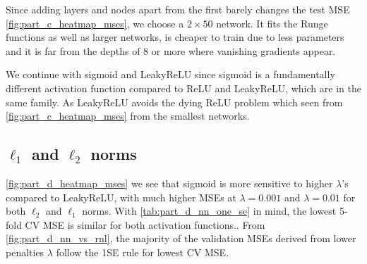 \documentclass[reprint,english,notitlepage, floatfix]{revtex4-2}  %
\begin{document}
Since adding layers and nodes apart from the first barely changes the test MSE \autoref{fig:part_c_heatmap_mses}, we choose a $2 \times 50$ network. It fits the Runge functions as well as larger networks, is cheaper to train due to less parameters and it is far from the depths of 8 or more where vanishing gradients appear.

We continue with sigmoid and LeakyReLU since sigmoid is a fundamentally different activation function compared to ReLU and LeakyReLU, which are in the same family. As LeakyReLU avoids the dying ReLU problem which seen from \autoref{fig:part_c_heatmap_mses} from the smallest networks.

\subsection{$\ell_1$ and $\ell_2$ norms}\label{sec:res_d} %


\autoref{fig:part_d_heatmap_mses} we see that sigmoid is more sensitive to higher $\lambda$'s compared to LeakyReLU, with much higher MSEs at $\lambda = 0.001$ and $\lambda=0.01$ for both $\ell_2$ and $\ell_1$ norms. With \autoref{tab:part_d_nn_one_se} in mind, the lowest 5-fold CV MSE is similar for both activation functions.. From \autoref{fig:part_d_nn_vs_rnl}, the majority of the validation MSEs derived from lower penalties $\lambda$ follow the 1SE rule for lowest CV MSE.


\begin{table}[htbp]
    \centering
\caption{The lowest cross-validated MSE is nearly the same for both activation functions in the 2 x 50 network for both penalties. Whereas the one standard error choices for sigmoid is higher than the one standard error choices for LeakyReLU}
    \label{tab:part_d_nn_one_se}
    \setlength{\tabcolsep}{4pt}
\end{table}
\end{document}
